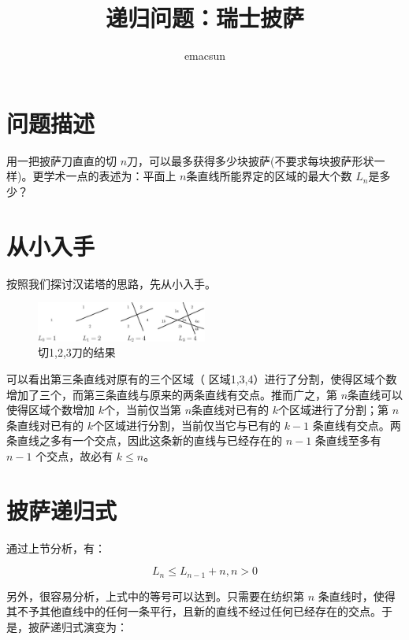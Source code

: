 \documentclass[10pt,a4paper,UTF8]{article}
\author{emacsun}
\date{}
\title{递归问题：瑞士披萨}
\begin{document}
\maketitle\xiaosihao
\tableofcontents\newpage\newpage


\section{问题描述}
\label{sec:orgheadline1}


用一把披萨刀直直的切 \(n\)刀，可以最多获得多少块披萨(不要求每块披萨形状一样)。更学术一点的表述为：平面上 \(n\)条直线所能界定的区域的最大个数 \(L_{n}\)是多少？

\section{从小入手}
\label{sec:orgheadline2}

按照我们探讨汉诺塔的思路，先从小入手。

\begin{figure}[htb]
\centering
\includegraphics[width=0.5\textwidth]{../../img/pissa.jpg}
\caption{切1,2,3刀的结果}
\end{figure}

可以看出第三条直线对原有的三个区域（ 区域1,3,4）进行了分割，使得区域个数增加了三个，而第三条直线与原来的两条直线有交点。推而广之，第 \(n\)条直线可以使得区域个数增加 \(k\)个，当前仅当第 \(n\)条直线对已有的 \(k\)个区域进行了分割；第 \(n\)条直线对已有的 \(k\)个区域进行分割，当前仅当它与已有的 \(k-1\) 条直线有交点。两条直线之多有一个交点，因此这条新的直线与已经存在的 \(n-1\) 条直线至多有 \(n-1\) 个交点，故必有 \(k\le n\)。

\section{披萨递归式}
\label{sec:orgheadline3}

通过上节分析，有：

\begin{equation}
\label{eq:1}
L_{n} \le L_{n-1} + n, n>0
\end{equation}

另外，很容易分析，上式中的等号可以达到。只需要在纺织第 \(n\) 条直线时，使得其不予其他直线中的任何一条平行，且新的直线不经过任何已经存在的交点。于是，披萨递归式演变为：
\end{document}
